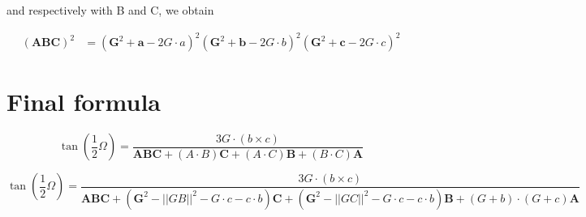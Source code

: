 \documentclass[10pt,a4paper]{article}
\begin{document}
and respectively with B and C, we obtain


\begin{align}
(\mathbf{A}\mathbf{B}\mathbf{C})^2 &= (\mathbf{G}^2 + \mathbf{a} - 2 G \cdot a )^2(\mathbf{G}^2 + \mathbf{b} - 2 G \cdot b)^2(\mathbf{G}^2 + \mathbf{c} - 2 G \cdot c)^2 
\end{align}


\section{Final formula}


$$
{\displaystyle \tan \left({\frac {1}{2}}\Omega \right)
  = {\frac {3 G \cdot \left( b \times c \right)}
    {\mathbf{A}\mathbf{B}\mathbf{C} + \left({A}\cdot {B}\right)\mathbf{C}
      + \left({A}\cdot {C}\right)\mathbf{B}
      + \left({B}\cdot {C}\right)\mathbf{A}}}}
$$


$$
{\displaystyle \tan \left({\frac {1}{2}}\Omega \right)
  = {\frac {3 G \cdot \left( b \times c \right)}
    {\mathbf{A}\mathbf{B}\mathbf{C} +
    (\mathbf{G}^2 - ||GB||^2 - G \cdot c - c \cdot b)\mathbf{C}
      + (\mathbf{G}^2 - ||GC||^2 - G \cdot c - c \cdot b)\mathbf{B}
      + \left( G + b \right) \cdot \left( G + c \right) \mathbf{A}
      }}}
$$
\end{document}

